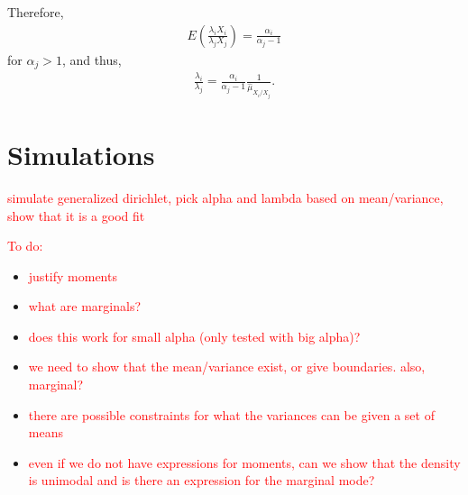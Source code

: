 \documentclass[ba]{imsart}
\numberwithin{equation}{section}
\theoremstyle{plain}
\newtheorem{thm}{Theorem}[section]
\newcommand{\falta}[1]{\textcolor{red}{#1}}
\begin{document}
Therefore, 
\begin{align*}
E \left( \frac{\lambda_iX_i}{\lambda_jX_j} \right) = \frac{\alpha_i}{\alpha_j-1}
\end{align*}
for $\alpha_j>1$, and thus,
\begin{align*}
\frac{\lambda_i}{\lambda_j} = \frac{\alpha_i}{\alpha_j-1} \frac{1}{\hat{\mu}_{X_i/X_j}}.
\end{align*}




\section{Simulations}

\falta{simulate generalized dirichlet, pick alpha and lambda based on
  mean/variance, show that it is a good fit}






\falta{To do:}
\begin{itemize}
\item \falta{justify moments} 
\item \falta{what are marginals?} 
\item \falta{does this work for small alpha (only tested with big
    alpha)?}
\item \falta{we need to show that the mean/variance exist, or give
    boundaries. also, marginal?}
\item \falta{there are possible constraints for what the variances can
    be given a set of means}
\item \falta{even if we do not have expressions for moments, can we
    show that the density is unimodal and is there an expression for
    the marginal mode?}
\end{itemize}
\end{document}

